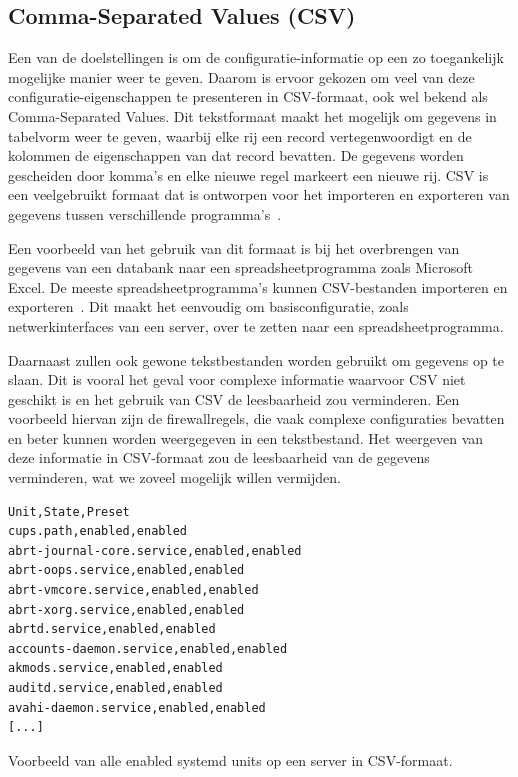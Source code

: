 \subsection{Comma-Separated Values (CSV)}
\label{poc_functionaliteiten_csv}

Een van de doelstellingen is om de configuratie-informatie op een zo toegankelijk mogelijke manier weer te geven.
Daarom is ervoor gekozen om veel van deze configuratie-eigenschappen te presenteren in CSV-formaat, ook wel bekend als Comma-Separated Values.
Dit tekstformaat maakt het mogelijk om gegevens in tabelvorm weer te geven, waarbij elke rij een record vertegenwoordigt en de kolommen de eigenschappen van dat record bevatten.
De gegevens worden gescheiden door komma's en elke nieuwe regel markeert een nieuwe rij.
CSV is een veelgebruikt formaat dat is ontworpen voor het importeren en exporteren van gegevens tussen verschillende programma's~\autocite{shafranovich2005common}.

Een voorbeeld van het gebruik van dit formaat is bij het overbrengen van gegevens van een databank naar een spreadsheetprogramma zoals Microsoft Excel.
De meeste spreadsheetprogramma's kunnen CSV-bestanden importeren en exporteren~\autocite{shafranovich2005common}.
Dit maakt het eenvoudig om basisconfiguratie, zoals netwerkinterfaces van een server, over te zetten naar een spreadsheetprogramma.

Daarnaast zullen ook gewone tekstbestanden worden gebruikt om gegevens op te slaan.
Dit is vooral het geval voor complexe informatie waarvoor CSV niet geschikt is en het gebruik van CSV de leesbaarheid zou verminderen.
Een voorbeeld hiervan zijn de firewallregels, die vaak complexe configuraties bevatten en beter kunnen worden weergegeven in een tekstbestand.
Het weergeven van deze informatie in CSV-formaat zou de leesbaarheid van de gegevens verminderen, wat we zoveel mogelijk willen vermijden.

\begin{listing}
  \begin{verbatim}
Unit,State,Preset
cups.path,enabled,enabled
abrt-journal-core.service,enabled,enabled
abrt-oops.service,enabled,enabled
abrt-vmcore.service,enabled,enabled
abrt-xorg.service,enabled,enabled
abrtd.service,enabled,enabled
accounts-daemon.service,enabled,enabled
akmods.service,enabled,enabled
auditd.service,enabled,enabled
avahi-daemon.service,enabled,enabled
[...]
  \end{verbatim}
  \caption[Enabled systemd units in CSV-formaat.]{Voorbeeld van alle enabled systemd units op een server in CSV-formaat.}
  \label{lst:poc-network-csv}
\end{listing}

